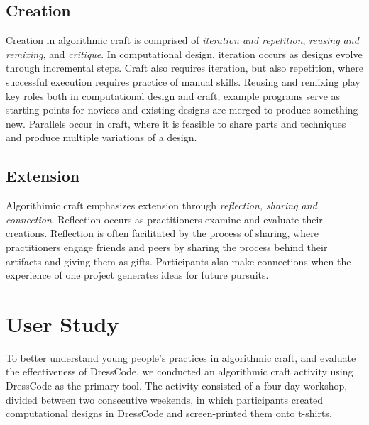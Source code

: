 \documentclass{sigchi}
\begin{document}
\subsection{Creation}
Creation in algorithmic craft is comprised of \emph{iteration and repetition}, \emph{reusing and remixing}, and \emph{critique}. In computational design, iteration occurs as designs evolve through incremental steps. Craft also requires iteration, but also repetition, where successful execution requires practice of manual skills. Reusing and remixing play key roles both in computational design and craft; example programs serve as starting points for novices and existing designs are merged to produce something new. Parallels occur in craft, where it is feasible to share parts and techniques and produce multiple variations of a design.

\subsection{Extension}
Algorithimic craft emphasizes extension through \emph{reflection, sharing and connection}. Reflection occurs as practitioners examine and evaluate their creations.  Reflection is often facilitated by the process of sharing, where practitioners engage friends and peers by sharing the process behind their artifacts and giving them as gifts. Participants also make connections when the experience of one project generates ideas for future pursuits.

\section{User Study}
To better understand young people's practices in algorithmic craft, and evaluate the effectiveness of DressCode, we conducted an algorithmic craft activity using DressCode as the primary tool. The activity consisted of a four-day workshop, divided between two consecutive weekends, in which participants created computational designs in DressCode and screen-printed them onto t-shirts.
\end{document}
